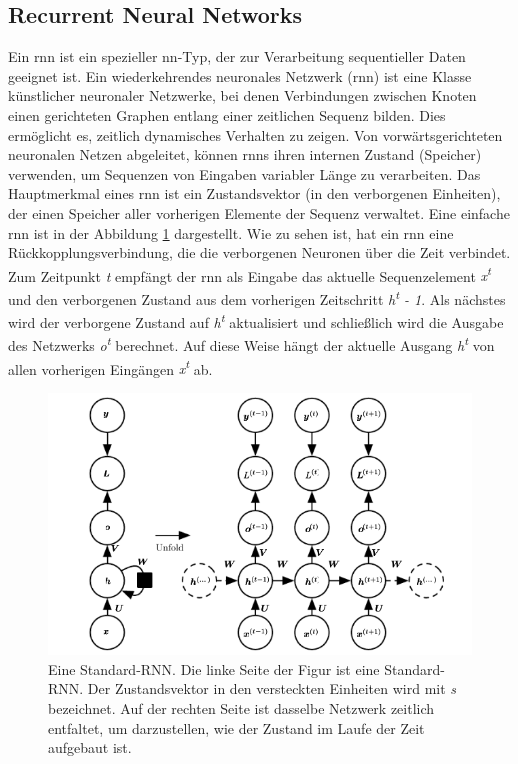 \documentclass[
        ngerman,
        paper=a4,
        numbers=noendperiod,
]{scrreprt}
\begin{document}
\subsection{Recurrent Neural Networks}
Ein \ac{rnn} ist ein spezieller \ac{nn}-Typ, der zur Verarbeitung sequentieller Daten geeignet ist. Ein wiederkehrendes neuronales Netzwerk (\ac{rnn}) ist eine Klasse künstlicher neuronaler Netzwerke, bei denen Verbindungen zwischen Knoten einen gerichteten Graphen entlang einer zeitlichen Sequenz bilden. Dies ermöglicht es, zeitlich dynamisches Verhalten zu zeigen. Von vorwärtsgerichteten neuronalen Netzen abgeleitet, können \ac{rnn}s ihren internen Zustand (Speicher) verwenden, um Sequenzen von Eingaben variabler Länge zu verarbeiten. Das Hauptmerkmal eines \ac{rnn} ist ein Zustandsvektor (in den verborgenen Einheiten), der einen Speicher aller vorherigen Elemente der Sequenz verwaltet. Eine einfache \ac{rnn} ist in der Abbildung \ref{fig:rnn} dargestellt. Wie zu sehen ist, hat ein \ac{rnn} eine Rückkopplungsverbindung, die die verborgenen Neuronen über die Zeit verbindet. Zum Zeitpunkt \textit{t} empfängt der \ac{rnn} als Eingabe das aktuelle Sequenzelement \textit{x\textsuperscript{t}} und den verborgenen Zustand aus dem vorherigen Zeitschritt \textit{h\textsuperscript{t} - 1}. Als nächstes wird der verborgene Zustand auf \textit{h\textsuperscript{t}} aktualisiert und schließlich wird die Ausgabe des Netzwerks \textit{o\textsuperscript{t}} berechnet. Auf diese Weise hängt der aktuelle Ausgang \textit{h\textsuperscript{t}} von allen vorherigen Eingängen \textit{x\textsuperscript{t}} ab.
\begin{figure}[H]
    \centering\includegraphics[width=.9\linewidth]{images/rnn.png}
    \caption[Eine Standard-RNN]{Eine Standard-RNN. Die linke Seite der Figur ist eine Standard-RNN. Der Zustandsvektor in den versteckten Einheiten wird mit \textit{s} bezeichnet. Auf der rechten Seite ist dasselbe Netzwerk zeitlich entfaltet, um darzustellen, wie der Zustand im Laufe der Zeit aufgebaut ist. \citep{IanGoodfellowYoshuaBengio2016DeepLearning}}
    \label{fig:rnn}
\end{figure}
\end{document}
